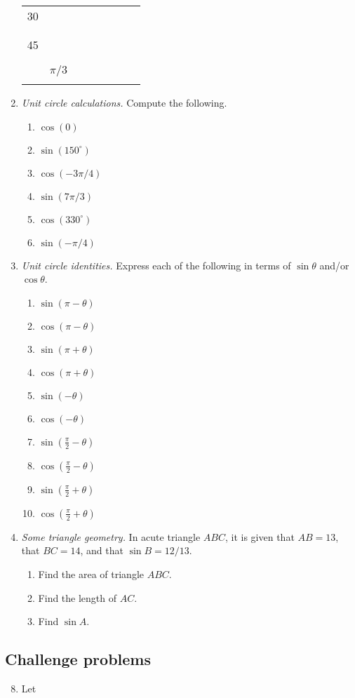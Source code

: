 \begin{enumerate}
\begin{center}
\begin{tabular}{c|c||c|c|c|c|c|c}
30 & & & & & & & \\
 & & & & & & & \\ \hline
 & & & & & & & \\
45 & & & & & & & \\
 & & & & & & & \\ \hline
 & & & & & & & \\
 & $\pi/3$ & & & & & & \\
 & & & & & & & 
\end{tabular}
\end{center}\newpage
\item \emph{Unit circle calculations.} Compute the following.
\begin{enumerate}
\item $\cos(0)$
\item $\sin(150^{\circ})$
\item $\cos(-3\pi/4)$
\item $\sin(7\pi/3)$
\item $\cos(330^{\circ})$
\item $\sin(-\pi/4)$
\end{enumerate}
\item \emph{Unit circle identities.} Express each of the following in terms of $\sin\theta$ and/or $\cos\theta$.
\begin{enumerate}
\item $\sin(\pi - \theta)$
\item $\cos(\pi - \theta)$
\item $\sin(\pi + \theta)$
\item $\cos(\pi + \theta)$
\item $\sin(-\theta)$
\item $\cos(-\theta)$
\item $\sin(\frac{\pi}{2} - \theta)$
\item $\cos(\frac{\pi}{2} - \theta)$
\item $\sin(\frac{\pi}{2} + \theta)$
\item $\cos(\frac{\pi}{2} + \theta)$
\end{enumerate}
\item \emph{Some triangle geometry.} In acute triangle $ABC$, it is given that $AB = 13$, that $BC = 14$, and that $\sin B = 12/13$.
\begin{enumerate}
\item Find the area of triangle $ABC$.
\item Find the length of $AC$.
\item Find $\sin A$.
\end{enumerate}
\end{enumerate}


\subsection{Challenge problems}

\begin{enumerate}\setcounter{enumi}{7}
\item Let 
\end{enumerate}


